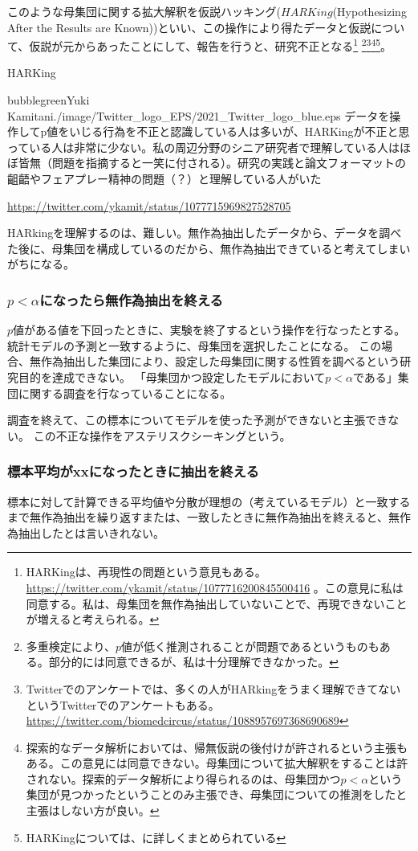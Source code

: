 このような母集団に関する拡大解釈を仮説ハッキング($HARKing$(Hypothesizing After the Results are Known))といい、この操作により得たデータと仮説について、仮説が元からあったことにして、報告を行うと、研究不正となる\footnote{
    HARKingは、再現性の問題という意見もある。
    \url{https://twitter.com/ykamit/status/1077716200845500416} 。この意見に私は同意する。私は、母集団を無作為抽出していないことで、再現できないことが増えると考えられる。
}
\footnote{
    多重検定により、$p$値が低く推測されることが問題であるというものもある\cite{池田_功毅2016,中村_大輝2021sp20016}。部分的には同意できるが、私は十分理解できなかった。
}\footnote{
    Twitterでのアンケートでは、多くの人がHARkingをうまく理解できてないというTwitterでのアンケートもある。
    \url{https://twitter.com/biomedcircus/status/1088957697368690689}
}\footnote{
    探索的なデータ解析においては、帰無仮説の後付けが許されるという主張もある。この意見には同意できない。母集団について拡大解釈をすることは許されない。探索的データ解析により得られるのは、母集団かつ$p<\alpha$という集団が見つかったということのみ主張でき、母集団についての推測をしたと主張はしない方が良い。
}\footnote{
    HARKingについては、\cite{kerr1998harking}に詳しくまとめられている
}。



\begin{SMbox}{HARKing}
    \begin{rightbubbles}{bubblegreen}{Yuki Kamitani}{./image/Twitter_logo_EPS/2021_Twitter_logo_blue.eps}
    データを操作してp値をいじる行為を不正と認識している人は多いが、HARKingが不正と思っている人は非常に少ない。私の周辺分野のシニア研究者で理解している人はほぼ皆無（問題を指摘すると一笑に付される）。研究の実践と論文フォーマットの齟齬やフェアプレー精神の問題（？）と理解している人がいた
        \begin{flushright} 
            \small	\url{https://twitter.com/ykamit/status/1077715969827528705}
        \end{flushright}    
    \end{rightbubbles}

    HARkingを理解するのは、難しい。無作為抽出したデータから、データを調べた後に、母集団を構成しているのだから、無作為抽出できていると考えてしまいがちになる。
  \end{SMbox}
  

\subsubsection{$p<\alpha$になったら無作為抽出を終える}
$p$値がある値を下回ったときに、実験を終了するという操作を行なったとする。
統計モデルの予測と一致するように、母集団を選択したことになる。
この場合、無作為抽出した集団により、設定した母集団に関する性質を調べるという研究目的を達成できない。
「母集団かつ設定したモデルにおいて$p<\alpha$である」集団に関する調査を行なっていることになる。

調査を終えて、この標本についてモデルを使った予測ができないと主張できない。
この不正な操作をアステリスクシーキングという。


\subsubsection{標本平均がxxになったときに抽出を終える}
標本に対して計算できる平均値や分散が理想の（考えているモデル）と一致するまで無作為抽出を繰り返すまたは、一致したときに無作為抽出を終えると、無作為抽出したとは言いきれない。


